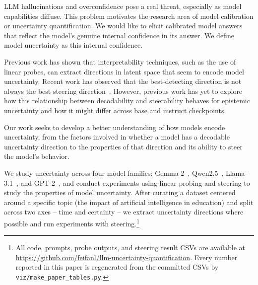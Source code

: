 \documentclass{article}
\begin{document}
LLM hallucinations and overconfidence pose a real threat, especially as model capabilities diffuse. This problem motivates the research area of model calibration or uncertainty quantification. We would like to elicit calibrated model answers that reflect the model's genuine internal confidence in its answer. We define model uncertainty as this internal confidence.

Previous work has shown that interpretability techniques, such as the use of linear probes, can extract directions in latent space that seem to encode model uncertainty. Recent work has observed that the best-detecting direction is not always the best steering direction~\citep{vonrutte2024guide}. However, previous work has yet to explore how this relationship between decodability and steerability behaves for epistemic uncertainty and how it might differ across base and instruct checkpoints.

Our work seeks to develop a better understanding of how models encode uncertainty, from the factors involved in whether a model has a decodable uncertainty direction to the properties of that direction and its ability to steer the model's behavior.

We study uncertainty across four model families: Gemma-2~\citep{gemma2024}, Qwen2.5~\citep{qwen2024}, Llama-3.1~\citep{llama2024}, and GPT-2~\citep{radford2019language}, and conduct experiments using linear probing and steering to study the properties of model uncertainty. After curating a dataset centered around a specific topic (the impact of artificial intelligence in education) and split across two axes -- time and certainty -- we extract uncertainty directions where possible and run experiments with steering.\footnote{All code, prompts, probe outputs, and steering result CSVs are available at \url{https://github.com/feifanl/llm-uncertainty-quantification}. Every number reported in this paper is regenerated from the committed CSVs by \texttt{viz/make\_paper\_tables.py}.}
\end{document}
